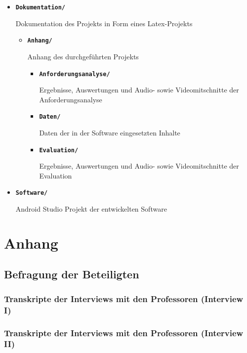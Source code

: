 \documentclass[bibliography=totoc,listof=totoc,BCOR=5mm,DIV=12,oneside]{scrbook}
\begin{document}
{\begin{itemize}
\item[] \textbf{\texttt{Dokumentation/}}
\par Dokumentation des Projekts in Form eines Latex-Projekts
\begin{itemize}
\item[] \textbf{\texttt{Anhang/}}
\par Anhang des durchgeführten Projekts
	\begin{itemize}
		\item[] \textbf{\texttt{Anforderungsanalyse/}}
		\par Ergebnisse, Auswertungen und Audio- sowie Videomitschnitte der Anforderungsanalyse
		\item[] \textbf{\texttt{Daten/}}
		\par Daten der in der Software eingesetzten Inhalte
		\item[] \textbf{\texttt{Evaluation/}}
		\par Ergebnisse, Auswertungen und Audio- sowie Videomitschnitte der Evaluation
	\end{itemize}
\end{itemize}
\item[] \textbf{\texttt{Software/}}
\par Android Studio Projekt der entwickelten Software
\end{itemize}

\newpage
\appendix


\chapter{Anhang}

\newpage
\section{Befragung der Beteiligten}
\label{anhang:interviewProfessorenTranskripte}
\newpage
\subsection{Transkripte der Interviews mit den Professoren (Interview I)}
\label{anhang:interviewProfessorenTranskripteInterviewI}


\subsection{Transkripte der Interviews mit den Professoren (Interview II)}
\label{anhang:interviewProfessorenTranskripteInterviewI}


}
\end{document}
